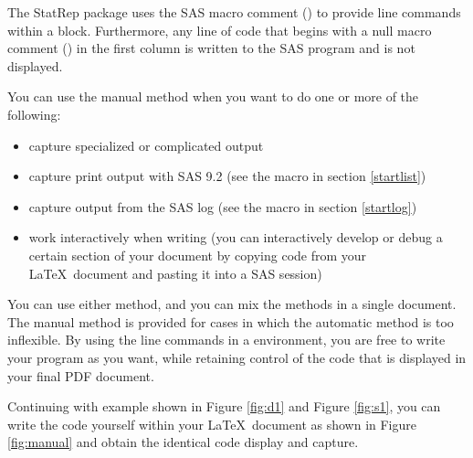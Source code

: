 \documentclass[article,oneside]{memoir}
\newcommand*{\StatRep}{\textsf{StatRep}\xspace}
\begin{document}
The \StatRep package uses
  the SAS macro comment () to provide line 
  commands within a 
  block. Furthermore, any line of code that begins with a null macro 
  comment (\Code{\%*;}) 
  in the first column is written to
  the SAS program and is not displayed. 

You can use the manual method when you want to do one or more of the following:
\begin{itemize}
\item capture specialized or complicated output
\item capture print output with SAS 9.2 (see the  macro in section \ref{startlist})
\item capture output from the SAS log (see the  macro in section \ref{startlog})
\item work interactively when writing (you can interactively develop or debug a 
        certain section of your document by copying code from
        your \LaTeX\ document and pasting it into a SAS session)
\end{itemize}

 You can use either method, and you can
mix the methods in a single document. The manual method is provided for cases in which the 
automatic method is too inflexible. By using the line commands in a  environment,
you are free to write your program as you want, while retaining control of the code that is
displayed in your final PDF document.

  Continuing with example shown in Figure \ref{fig:d1} and Figure \ref{fig:s1}, 
  you can write the code yourself within your 
  \LaTeX\ document as shown in Figure \ref{fig:manual} 
  and obtain the identical code display and capture.
  
\end{document}
